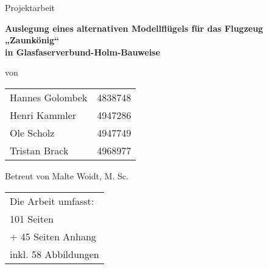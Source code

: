 
\begin{center}

	\par\bigskip
	\par\bigskip
	\par\bigskip
	\par\bigskip	
	\par\bigskip
	\par\bigskip	
	{Projektarbeit}\\
\begin{huge}	\par\bigskip
	\par\bigskip	
	\par\bigskip
	\par\bigskip	
	\textbf{Auslegung eines alternativen Modellflügels für das Flugzeug „Zaunkönig“} \\
	\textbf{in Glasfaserverbund-Holm-Bauweise}\\
	\par\bigskip
	\par\bigskip
	
	\end{huge}

	\par\bigskip
	
\par\bigskip
\par\bigskip	
	\par\bigskip
\par\bigskip
von	
\par\bigskip
\par\bigskip
\begin{tabular}{lr}
	Hannes Golombek & 4838748\\
	Henri Kammler & 4947286\\
	Ole Scholz & 4947749 \\
	Tristan Brack& 4968977\\
\end{tabular}
\par\bigskip
\par\bigskip	
\par\bigskip

Betreut von Malte Woidt, M. Sc.\\
\par\bigskip
\par\bigskip
\par\bigskip	
\par\bigskip
\par\bigskip	
\par\bigskip
\end{center}
\begin{tabular}{l}
	Die Arbeit umfasst:\\
	101 Seiten\\
	\:\:\:+ 45 Seiten Anhang\\
	inkl. 58 Abbildungen\\
\end{tabular}

